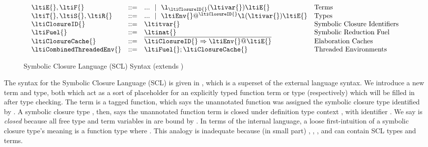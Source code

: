 \begin{figure}
$$
\begin{array}{lrll}
  \ltiE{}, \ltiF{} &::=& ... \alt
                         \ltiufunelab{\ltiufunelabentry{\ltiClosureID{}}}
                                     {\ltivar{}}
                                     {\ltiE{}}
                      &\mbox{Terms} \\
  \ltiT{}, \ltiS{}, \ltiR{} &::=& ... \alt \ltiClosureWithStkID{\ltiEnv{}}{\ltiClosureID{}}{\ltiufun{\ltivar{}}{\ltiE{}}}
                      &\mbox{Types} \\
  \ltiClosureID{} &::=& \ltitvar{}
                      &\mbox{Symbolic Closure Identifiers} \\
  \ltiFuel{} &::=& \ltinat{}
                      &\mbox{Symbolic Reduction Fuel} \\
  \ltiClosureCache{} &::=& \ova{\ltiClosureCacheEntry
                                {\ltiClosureID{}}
                                {\ltiClosure{\ltiEnv{}}{\ltiE{}}}}
                      &\mbox{Elaboration Caches}
                      \\
  \ltiCombinedThreadedEnv{} &::=& \ltimakeCombinedThreadedEnv{\ltiFuel{}}{\ltiClosureCache{}}
                      &\mbox{Threaded Environments}
\end{array}
$$
\caption{Symbolic Closure Language (SCL) Syntax (extends )}
\label{symbolic:figure:SC-language-syntax}
\end{figure}

The syntax for the Symbolic Closure Language (SCL)
is given in 
, which
is a superset of the external language syntax.
We introduce a new term and type, both which act as
a sort of placeholder for an explicitly typed function term or type (respectively)
which will be filled in after type checking.
The term
\ltiufunelab{\ltiufunelabentry{\ltiClosureID{}}}
            {\ltivar{}}
            {\ltiE{}}
is a tagged function,
which says the unannotated function 
\ltiufun{\ltivar{}}{\ltiE{}}
was assigned the symbolic closure type identified by
\ltiClosureID{}.
A symbolic closure type
\ltiClosureWithStkID{\ltiEnv{}}{\ltiClosureID{}}{\ltiufun{\ltivar{}}{\ltiE{}}},
then,
says the unannotated function term \ltiufun{\ltivar{}}{\ltiE{}}
is closed under definition type context \ltiEnv{}, with identifier \ltiClosureID{}.
We say \ltiufun{\ltivar{}}{\ltiE{}} is \emph{closed} because all free type and term variables in \ltiufun{\ltivar{}}{\ltiE{}}
are bound by \ltiEnv{}.
In terms of the internal language,
a loose first-intuition of a symbolic closure type's meaning
is a function type
\ltiPolyFn{\ltiT{}}{\ova{\ltitvar{}}}{\ltiS{}}
where
\ltitjudgementNoElab{\ltiEnvConcat{\ltiEnv{}}
                    {\ltiEnvConcat{\ova{\ltitvar{}}}
                                  {\hastype{\ltivar{}}{\ltiT{}}}}}
                    {\ltiE{}}
                    {\ltiS{}}.
This analogy is inadequate because (in small part) \ltiEnv{}, \ltiT{}, \ltiE{}, and \ltiS{}
can contain SCL types and terms.

